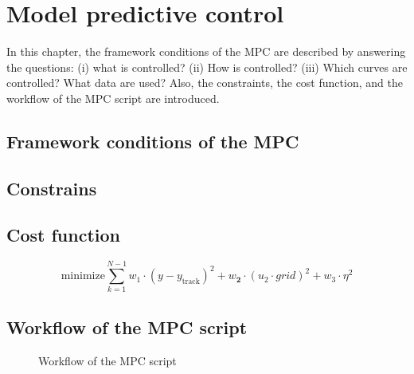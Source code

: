 \chapter{Model predictive control}
\label{ch:mpc}
In this chapter, the framework conditions of the MPC are described by answering the questions: (i) what is controlled? (ii) How is controlled? (iii) Which curves are controlled? What data are used? Also, the constraints, the cost function, and the workflow of the MPC script are introduced.  

\section{Framework conditions of the MPC}
\label{section:FrameworkMPC}

\section{Constrains}
\label{section:constrains}
\section{Cost function}
\label{section:costfunction}
\begin{equation}
    \text{minimize} \sum_{k=1}^{N-1} w_\text{1}\cdot (y-y_\text{track})^2 + w_\textbf{2}\cdot(u_\text{2}\cdot grid)^2 + w_\text{3} \cdot \eta^2
\end{equation}
\section{Workflow of the MPC script}
\label{section:costfunction}
\begin{figure}[h]
            \centering
            \def\svgwidth{0.6\textwidth}
            
            \caption{Workflow of the MPC script}
            \label{fig:workflowMPC}
    \end{figure}